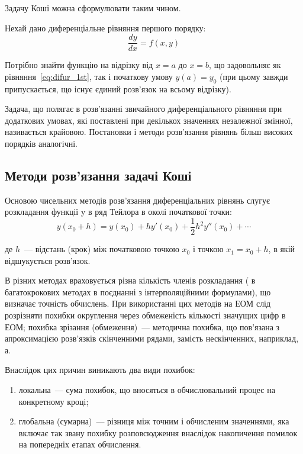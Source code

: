 Задачу Коші можна сформулювати таким чином.

Нехай дано диференціальне рівняння першого порядку:
\begin{equation}\label{eq:difur_1st}
  \frac{dy}{dx} = f(x,y)
\end{equation}

Потрібно знайти функцію на відрізку від $ {x=a} $ до $ {x=b} $, що задовольняє як рівняння~\eqref{eq:difur_1st}, 
так і початкову умову $y(a) = y_0$ (при цьому завжди припускається, що існує єдиний розв’язок на всьому відрізку).

Задача, що полягає в розв’язанні звичайного диференціального рівняння при додаткових умовах, які поставлені при декількох значеннях незалежної змінної, називається крайовою.
Постановки і методи розв’язання рівнянь більш високих порядків аналогічні.

\subsection{Методи розв’язання задачі Коші}

Основою чисельних методів розв’язання диференціальних рівнянь слугує розкладання функції y в ряд Тейлора в околі початкової точки:
\begin{equation}\label{eq:tailor}
  y(x_0+h) = y(x_0)+hy'(x_0)+
  \frac{1}{2}h^2y''(x_0)+\cdots
\end{equation}

де $h$~--- відстань (крок) між початковою точкою $x_0$ і точкою $x_1=x_0 + h$, в якій відшукується розв’язок.

В різних методах враховується різна кількість членів розкладання ( в
багатокрокових методах в поєднанні з інтерполяційними формулами),
що визначає точність обчислень. При використанні цих методів на ЕОМ
слід розрізняти похибки округлення через обмеженість кількості значущих
цифр в ЕОМ; похибка зрізання (обмеження)~--- методична похибка,
що пов’язана з апроксимацією розв’язків скінченними рядами,
замість нескінченних, наприклад, а. 

Внаслідок цих причин виникають два види похибок:
\begin{enumerate}
  \item локальна~--- сума похибок, що вносяться в обчислювальний
    процес на конкретному кроці;
  \item глобальна (сумарна)~--- різниця між точним і обчисленим
    значеннями, яка включає так звану похибку розповсюдження
    внаслідок накопичення помилок на попередніх етапах обчислення.
\end{enumerate}

